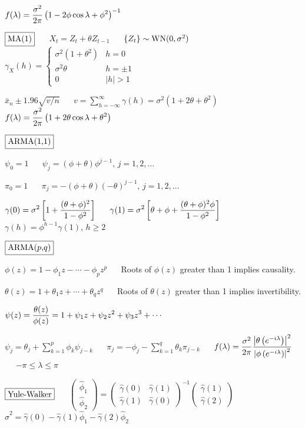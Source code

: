 \documentclass[12pt]{article}
\begin{document}
$\displaystyle
f(\lambda)={\sigma^2\over2\pi}\left(1-2\phi\cos\lambda+\phi^2\right)^{-1}$

$\boxed{\hbox{MA(1)}}$
$\quad$
$X_t=Z_t+\theta Z_{t-1}$
$\quad$
$\{Z_t\}\sim{\rm WN}(0,\sigma^2)$
$\quad$
$\displaystyle
\gamma_X(h)=\left\{\begin{array}{ll}
\sigma^2(1+\theta^2) & h=0\\
\sigma^2\theta & h=\pm1\\
0 & |h|>1
\end{array}\right.$

$\bar x_n\pm1.96\sqrt{v/n}$
$\quad$
$\displaystyle
v=\sum_{h=-\infty}^\infty\gamma(h)=\sigma^2(1+2\theta+\theta^2)$
$\quad$
$\displaystyle
f(\lambda)={\sigma^2\over2\pi}\left(1+2\theta\cos\lambda+\theta^2\right)$



$\boxed{\hbox{ARMA(1,1)}}$

$\psi_0=1$
$\quad$
$\psi_j=(\phi+\theta)\phi^{j-1}$, $j=1,2,\ldots$

$\pi_0=1$
$\quad$
$\pi_j=-(\phi+\theta)(-\theta)^{j-1}$, $j=1,2,\ldots$

$\displaystyle
\gamma(0)=\sigma^2\left[
1+{(\theta+\phi)^2\over1-\phi^2}\right]$
$\quad$
$\displaystyle
\gamma(1)=\sigma^2\left[
\theta+\phi+{(\theta+\phi)^2\phi\over1-\phi^2}\right]$
$\quad$
$\gamma(h)=\phi^{h-1}\gamma(1)$, $h\ge2$

$\boxed{\hbox{ARMA($p$,$q$)}}$

$\phi(z)=1-\phi_1z-\cdots-\phi_pz^p$
$\quad$
Roots of $\phi(z)$ greater than 1 implies causality.

$\theta(z)=1+\theta_1z+\cdots+\theta_qz^q$
$\quad$
Roots of $\theta(z)$ greater than 1 implies invertibility.

$\displaystyle
\psi(z)={\theta(z)\over\phi(z)}=1+\psi_1z+\psi_2z^2+\psi_3z^3+\cdots$

$\displaystyle
\psi_j=\theta_j+\sum_{k=1}^p\phi_k\psi_{j-k}$
$\quad$
$\displaystyle
\pi_j=-\phi_j-\sum_{k=1}^q\theta_k\pi_{j-k}$
$\quad$
$\displaystyle
f(\lambda)={\sigma^2\over2\pi}{\left|\theta\left(e^{-i\lambda}\right)\right|^2
\over\left|\phi\left(e^{-i\lambda}\right)\right|^2}$
$\quad$
$-\pi\le\lambda\le\pi$

$\boxed{\hbox{Yule-Walker}}$
$\quad$
$\begin{pmatrix}
\hat\phi_1\\
\hat\phi_2
\end{pmatrix}
=
\begin{pmatrix}
\hat\gamma(0) & \hat\gamma(1)\\
\hat\gamma(1) & \hat\gamma(0)
\end{pmatrix}^{-1}
\begin{pmatrix}
\hat\gamma(1)\\
\hat\gamma(2)
\end{pmatrix}
$
$\quad$
$\hat\sigma^2=\hat\gamma(0)-\hat\gamma(1)\hat\phi_1-\hat\gamma(2)\hat\phi_2$
\end{document}
